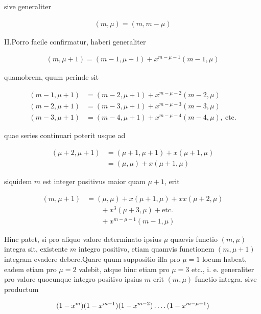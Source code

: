 %
sive generaliter

\[
\begin{aligned}
(m,\mu)=(m,m-\mu)
\end{aligned}
\]

II.\quad Porro facile confirmatur, haberi generaliter

\[
\begin{aligned}
(m,\mu+1)=(m-1,\mu+1)+x^{m-\mu-1}(m-1,\mu)
\end{aligned}
\]

quamobrem, quum perinde sit

\[
\begin{aligned}
(m-1,\mu+1)&=(m-2,\mu+1)+x^{m-\mu-2}(m-2,\mu)\\
(m-2,\mu+1)&=(m-3,\mu+1)+x^{m-\mu-3}(m-3,\mu)\\
(m-3,\mu+1)&=(m-4,\mu+1)+x^{m-\mu-4}(m-4,\mu),\ \text{etc.}
\end{aligned}
\]

quae series continuari poterit usque ad

\[
\begin{aligned}
(\mu+2,\mu+1)&=(\mu+1,\mu+1)+x(\mu+1,\mu)\\
&=(\mu,\mu)+x(\mu+1,\mu)
\end{aligned}
\]

siquidem $m$ est integer positivus maior quam $\mu+1$, erit

\[
\begin{aligned}
(m,\mu+1)&=(\mu,\mu)+x(\mu+1,\mu)+xx(\mu+2,\mu)\\
&\qquad+x^3(\mu+3,\mu)+\text{etc.}\\
&\qquad+x^{m-\mu-1}(m-1,\mu)
\end{aligned}
\]

Hinc patet, si pro aliquo valore determinato ipsius $\mu$ quaevis functio $(m,\mu)$ integra sit, existente $m$ integro positivo, etiam quamvis functionem $(m,\mu+1)$ integram evadere debere.\quad Quare quum suppositio illa pro $\mu=1$ locum habeat, eadem etiam pro $\mu=2$ valebit, atque hinc etiam pro $\mu=3$ etc., i. e. generaliter pro valore quocunque integro positivo ipsius $m$ erit $(m,\mu)$ functio integra. sive productum

\[
\begin{aligned}
(1-x^m)(1-x^{m-1})(1-x^{m-2})\mathinner{.\,.\,.\,.}(1-x^{m-\mu+1})
\end{aligned}
\]

